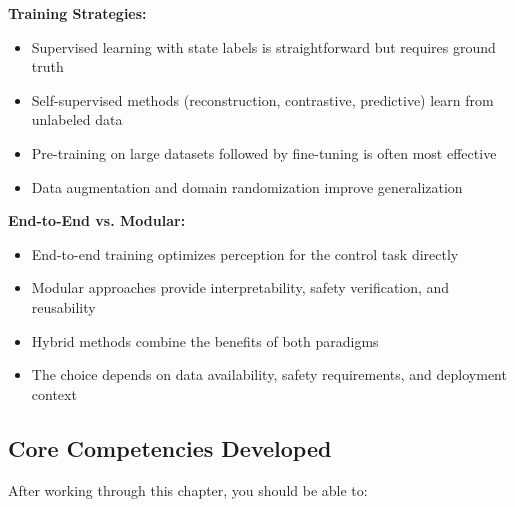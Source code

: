 \textbf{Training Strategies:}
\begin{itemize}
    \item Supervised learning with state labels is straightforward but requires ground truth
    \item Self-supervised methods (reconstruction, contrastive, predictive) learn from unlabeled data
    \item Pre-training on large datasets followed by fine-tuning is often most effective
    \item Data augmentation and domain randomization improve generalization
\end{itemize}

\textbf{End-to-End vs. Modular:}
\begin{itemize}
    \item End-to-end training optimizes perception for the control task directly
    \item Modular approaches provide interpretability, safety verification, and reusability
    \item Hybrid methods combine the benefits of both paradigms
    \item The choice depends on data availability, safety requirements, and deployment context
\end{itemize}

\subsection{Core Competencies Developed}

After working through this chapter, you should be able to:

